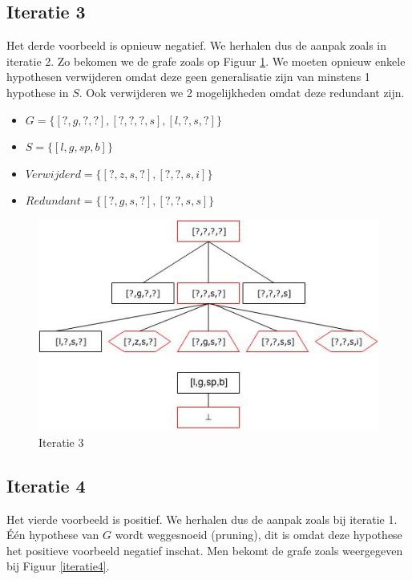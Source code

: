 \documentclass{article}
\begin{document}
\subsection{Iteratie 3}
Het derde voorbeeld is opnieuw negatief. We herhalen dus de aanpak zoals in iteratie 2. Zo bekomen we de grafe zoals op Figuur \ref{iteratie3}. We moeten opnieuw enkele hypothesen verwijderen omdat deze geen generalisatie zijn van minstens 1 hypothese in $S$. Ook verwijderen we 2 mogelijkheden omdat deze redundant zijn.

\begin{itemize}
\item $G = \{[?,g,?,?],[?,?,?,s],[l,?,s,?]\}$
\item $S = \{[l,g,sp,b]\}$
\item $Verwijderd = \{[?,z,s,?],[?,?,s,i]\}$
\item $Redundant = \{[?,g,s,?],[?,?,s,s]\}$
\end{itemize}

\begin{figure}[H]
\centering
\caption{Iteratie 3}
\label{iteratie3}
\includegraphics[scale=0.5]{iteration_graphs/iteration3.jpg}
\end{figure}

\newpage

\subsection{Iteratie 4}
Het vierde voorbeeld is positief. We herhalen dus de aanpak zoals bij iteratie 1. \'E\'en hypothese van $G$ wordt weggesnoeid (pruning), dit is omdat deze hypothese het positieve voorbeeld negatief inschat. Men bekomt de grafe zoals weergegeven bij Figuur \ref{iteratie4}.
\end{document}
